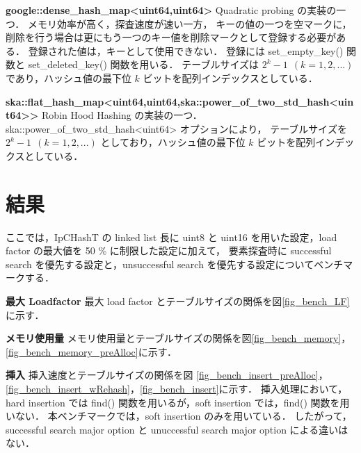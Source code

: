 %
{\bf google::dense\_hash\_map<uint64,uint64>}
\samepage\newline\indent
Quadratic probing の実装の一つ．
メモリ効率が高く，探査速度が速い一方，
キーの値の一つを空マークに，削除を行う場合は更にもう一つのキー値を削除マークとして登録する必要がある．
登録された値は，キーとして使用できない．
登録には set\_empty\_key() 関数と set\_deleted\_key() 関数を用いる．
テーブルサイズは $2^k-1\ \ (k=1,2,...)$ であり，ハッシュ値の最下位 $k$ ビットを配列インデックスとしている．
\leavevmode \newline

%
{\bf ska::flat\_hash\_map<uint64,uint64,ska::power\_of\_two\_std\_hash<uint64>>}
\samepage\newline\indent
Robin Hood Hashing の実装の一つ．
ska::power\_of\_two\_std\_hash<uint64> オプションにより，
テーブルサイズを $2^k-1\ \ (k=1,2,...)$ としており，ハッシュ値の最下位 $k$ ビットを配列インデックスとしている．
\leavevmode \newline


\section{結果}
ここでは，IpCHashT の linked list 長に uint8 と uint16 を用いた設定，load factor の最大値を 50 \% に制限した設定に加えて，
要素探査時に successful search を優先する設定と，unsuccessful search を優先する設定についてベンチマークする．
\leavevmode \newline

%
{\bf 最大 Loadfactor}
\samepage\newline\indent
最大 load factor とテーブルサイズの関係を図\ref{fig_bench_LF}に示す．
\leavevmode \newline

%
{\bf メモリ使用量}
\samepage\newline\indent
メモリ使用量とテーブルサイズの関係を図\ref{fig_bench_memory}，\ref{fig_bench_memory_preAlloc}に示す．
\leavevmode \newline

%
{\bf 挿入}
\samepage\newline\indent
挿入速度とテーブルサイズの関係を図
\ref{fig_bench_insert_preAlloc}，\ref{fig_bench_insert_wRehash}，\ref{fig_bench_insert}に示す．
挿入処理において，hard insertion では find() 関数を用いるが，soft insertion では，find() 関数を用いない．
本ベンチマークでは，soft insertion のみを用いている．
したがって，successful search major option と unuccessful search major option による違いはない．
\leavevmode \newline

